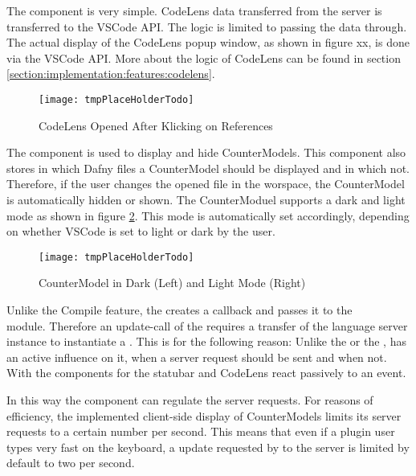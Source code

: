 The  component is very simple. CodeLens data transferred from the server is transferred to the VSCode API.
The logic is limited to passing the data through. The actual display of the CodeLens popup window, as shown in figure xx,
is done via the VSCode API.
More about the logic of CodeLens can be found in section \ref{section:implementation:features:codelens}.

\begin{figure}[H]
    \centering
    \texttt{[image: tmpPlaceHolderTodo]}
    \caption{CodeLens Opened After Klicking on References}
    \label{fig:dark_light_mode}
\end{figure}

The  component is used to display and hide CounterModels.
This component also stores in which Dafny files a CounterModel should be displayed and in which not.
Therefore, if the user changes the opened file in the worspace, the CounterModel is automatically hidden or shown.
The CounterModuel supports a dark and light mode as shown in figure \ref{fig:dark_light_mode}.
This mode is automatically set accordingly,
depending on whether VSCode is set to light or dark by the user.

\begin{figure}[H]
    \centering
    \texttt{[image: tmpPlaceHolderTodo]}
    \caption{CounterModel in Dark (Left) and Light Mode (Right)}
    \label{fig:dark_light_mode}
\end{figure}

Unlike the Compile feature, the  creates a callback and passes it to the \\
 module.
Therefore an update-call of the  requires a transfer of the language server instance to instantiate a .
This is for the following reason: Unlike the  or the ,
 has an active influence on it,
when a server request should be sent and when not.
With the components for the statubar and CodeLens react passively to an event.

In this way the  component can regulate the server requests.
For reasons of efficiency, the implemented client-side display of CounterModels limits its
server requests to a certain number per second.
This means that even if a plugin user types very fast on the keyboard, a
update requested by  to the server is limited by default to two per second. \\

